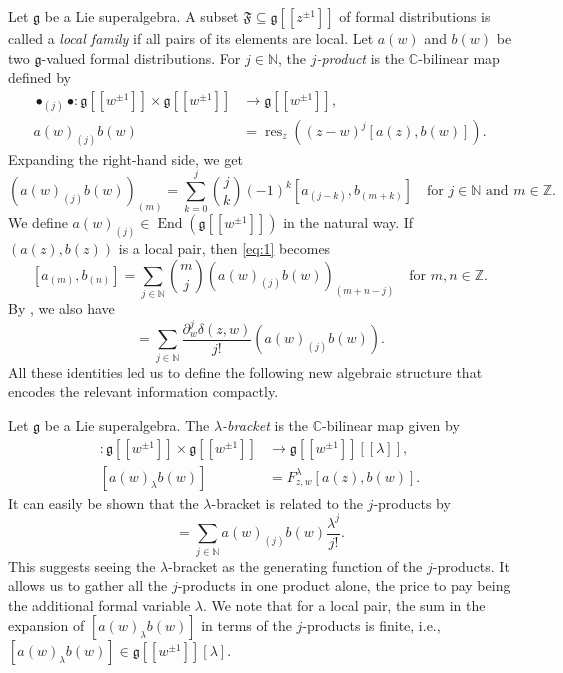 \documentclass[a4paper, 12pt, reqno]{amsart}
\theoremstyle{remark}
\DeclareMathOperator{\End}{End}
\DeclareMathOperator{\res}{res}
\begin{document}
Let $\mathfrak{g}$ be a Lie superalgebra.
A subset $\mathfrak{F} \subseteq \mathfrak{g}[[z^{\pm 1}]]$ of formal distributions is called a \emph{local family} if all pairs of its elements are local.
Let $a(w)$ and $b(w)$ be two $\mathfrak{g}$-valued formal distributions.
For $j \in \mathbb{N}$, the \emph{$j$-product} is the $\mathbb{C}$-bilinear map defined by
\begin{align}
  \nonumber
  \bullet_{(j)}\bullet: \mathfrak{g}[[w^{\pm 1}]] \times \mathfrak{g}[[w^{\pm 1}]] &\to \mathfrak{g}[[w^{\pm 1}]], \\
  \label{eq:2}
  a(w)_{(j)}b(w) &= \res_z((z - w)^j[a(z), b(w)]).
\end{align}
Expanding the right-hand side, we get
\begin{equation}
  \label{eq:3}
  (a(w)_{(j)}b(w))_{(m)} = \sum_{k = 0}^j\binom{j}{k}(-1)^k[a_{(j - k)}, b_{(m + k)}] \quad \text{for $j \in \mathbb{N}$ and $m \in \mathbb{Z}$}.
\end{equation}
We define $a(w)_{(j)} \in \End(\mathfrak{g}[[w^{\pm 1}]])$ in the natural way.
If $(a(z), b(z))$ is a local pair, then \eqref{eq:1} becomes
\begin{equation}
  \label{eq:4}
  [a_{(m)}, b_{(n)}] = \sum_{j \in \mathbb{N}}\binom{m}{j}(a(w)_{(j)}b(w))_{(m + n - j)} \quad \text{for $m, n \in \mathbb{Z}$}.
\end{equation}
By , we also have
\begin{equation*}
  [a(z), b(w)] = \sum_{j \in \mathbb{N}}\frac{\partial_w^j\delta(z, w)}{j!}(a(w)_{(j)}b(w)).
\end{equation*}
All these identities led us to define the following new algebraic structure that encodes the relevant information compactly.

Let $\mathfrak{g}$ be a Lie superalgebra.
The \emph{$\lambda$-bracket} is the $\mathbb{C}$-bilinear map given by
\begin{align*}
  [\bullet_{\lambda}\bullet]: \mathfrak{g}[[w^{\pm 1}]] \times \mathfrak{g}[[w^{\pm 1}]] &\to \mathfrak{g}[[w^{\pm 1}]][[\lambda]], \\
  [a(w)_{\lambda}b(w)] &= F^{\lambda}_{z, w}[a(z), b(w)].
\end{align*}
It can easily be shown that the $\lambda$-bracket is related to the $j$-products by
\begin{equation*}
  [a(w)_{\lambda}b(w)] = \sum_{j \in \mathbb{N}}a(w)_{(j)}b(w)\frac{\lambda^j}{j!}.
\end{equation*}
This suggests seeing the $\lambda$-bracket as the generating function of the $j$-products.
It allows us to gather all the $j$-products in one product alone, the price to pay being the additional formal variable $\lambda$.
We note that for a local pair, the sum in the expansion of $[a(w)_{\lambda}b(w)]$ in terms of the $j$-products is finite, i.e., $[a(w)_{\lambda}b(w)] \in \mathfrak{g}[[w^{\pm 1}]][\lambda]$.
\end{document}
